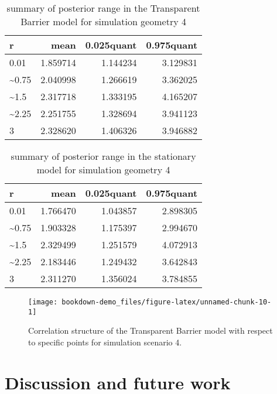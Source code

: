 \documentclass[
]{book}
\begin{document}
\begin{table}

\caption{\label{tab:unnamed-chunk-8}summary of posterior range in the Transparent Barrier model for simulation geometry 4}
\centering
\begin{tabular}[t]{l|r|r|r}
\hline
r & mean & 0.025quant & 0.975quant\\
\hline
0.01 & 1.859714 & 1.144234 & 3.129831\\
\hline
\textasciitilde{}0.75 & 2.040998 & 1.266619 & 3.362025\\
\hline
\textasciitilde{}1.5 & 2.317718 & 1.333195 & 4.165207\\
\hline
\textasciitilde{}2.25 & 2.251755 & 1.328694 & 3.941123\\
\hline
3 & 2.328620 & 1.406326 & 3.946882\\
\hline
\end{tabular}
\end{table}

\begin{table}

\caption{\label{tab:unnamed-chunk-9}summary of posterior range in the stationary model for simulation geometry 4}
\centering
\begin{tabular}[t]{l|r|r|r}
\hline
r & mean & 0.025quant & 0.975quant\\
\hline
0.01 & 1.766470 & 1.043857 & 2.898305\\
\hline
\textasciitilde{}0.75 & 1.903328 & 1.175397 & 2.994670\\
\hline
\textasciitilde{}1.5 & 2.329499 & 1.251579 & 4.072913\\
\hline
\textasciitilde{}2.25 & 2.183446 & 1.249432 & 3.642843\\
\hline
3 & 2.311270 & 1.356024 & 3.784855\\
\hline
\end{tabular}
\end{table}

\begin{figure}
\texttt{[image: bookdown-demo\_files/figure-latex/unnamed-chunk-10-1]} \caption{Correlation structure of the Transparent Barrier model with respect to specific points for simulation scenario 4.}\label{fig:unnamed-chunk-10}
\end{figure}

\hypertarget{discussion-and-future-work}{%
\section{Discussion and future work}\label{discussion-and-future-work}}
\end{document}

